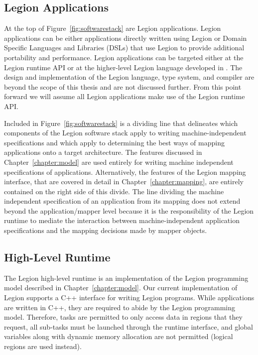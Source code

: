 \subsection{Legion Applications}
\label{subsec:legionapps}
At the top of Figure~\ref{fig:softwarestack} are Legion
applications. Legion applications can be either applications
directly written using Legion or Domain Specific Languages
and Libraries (DSLs) that use Legion to provide additional
portability and performance. Legion applications can be
targeted either at the Legion runtime API or at the 
higher-level Legion language developed in \cite{LegionTypes13}.
The design and implementation of the Legion language,
type system, and compiler are beyond the scope of this
thesis and are not discussed further.  From this point
forward we will assume all Legion applications make 
use of the Legion runtime API.

Included in Figure~\ref{fig:softwarestack} is a dividing
line that delineates which components of the Legion software 
stack apply to writing machine-independent specifications
and which apply to determining the best ways of
mapping applications onto a target architecture.
The features discussed in Chapter~\ref{chapter:model}
are used entirely for writing machine independent specifications
of applications. Alternatively, the features of the 
Legion mapping interface, that are covered in detail in
Chapter~\ref{chapter:mapping}, are entirely contained 
on the right side of this divide. The line dividing the
machine independent specification of an application from
its mapping does not extend beyond the application/mapper
level because it is the responsibility of the Legion
runtime to mediate the interaction between
machine-independent application specifications and
the mapping decisions made by mapper objects.

\subsection{High-Level Runtime}
\label{subsec:highlevel}
The Legion high-level runtime is an implementation
of the Legion programming model described in 
Chapter~\ref{chapter:model}. Our current implementation
of Legion supports a C++ interface for writing Legion
programs. While applications are written in C++, they
are required to abide by the Legion programming model.
Therefore, tasks are permitted to only access data
in regions that they request, all sub-tasks must be
launched through the runtime interface, and global
variables along with dynamic memory allocation are 
not permitted (logical regions are used instead).

